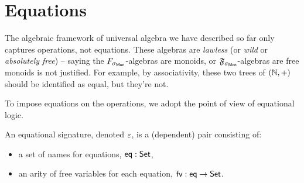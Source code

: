 \section{Equations}
\label{sec:universal-algebra:equations}

The algebraic framework of universal algebra we have described so far only captures operations, not equations.
%
These algebras are \emph{lawless} (or \emph{wild} or \emph{absolutely free}) --
saying the $\SigMon$-algebras are monoids, or $\mathfrak{F}_{\sigma_{\mathsf{Mon}}}$-algebras are free monoids is not justified.
%
For example, by associativity, these two trees of $(\mathbb{N}, +)$ should be identified as equal,
but they're not.
\begin{center}
\end{center}
%
To impose equations on the operations, we adopt the point of view of equational logic.

\begin{definition}
    An equational signature, denoted $\varepsilon$, is a (dependent) pair consisting of:
    \begin{itemize}
        \item a set of names for equations, $\operatorname{\mathsf{eq}} : \mathsf{Set}$,
        \item an arity of free variables for each equation, $\operatorname{\mathsf{fv}} : \operatorname{\mathsf{eq}} \to \mathsf{Set}$.
    \end{itemize}
\end{definition}

